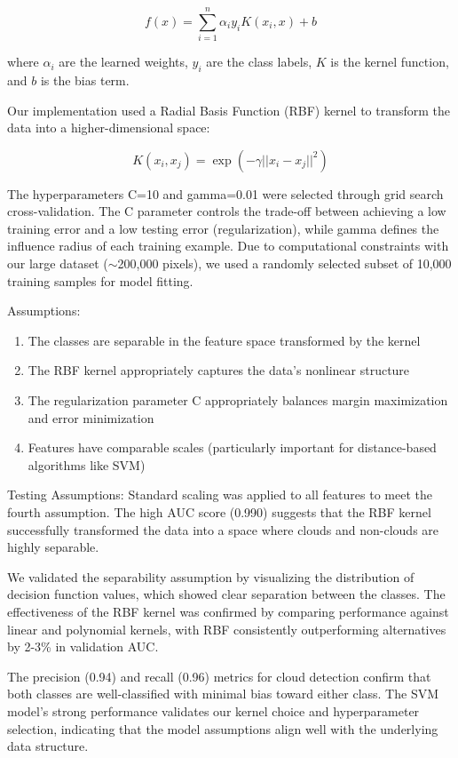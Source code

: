 \documentclass[10pt,letterpaper]{article}
\begin{document}
\begin{equation}
f(x) = \sum_{i=1}^{n} \alpha_i y_i K(x_i, x) + b
\end{equation}

where $\alpha_i$ are the learned weights, $y_i$ are the class labels, $K$ is the kernel function, and $b$ is the bias term. 

Our implementation used a Radial Basis Function (RBF) kernel to transform the data into a higher-dimensional space:

\begin{equation}
K(x_i, x_j) = \exp(-\gamma ||x_i - x_j||^2)
\end{equation}

The hyperparameters C=10 and gamma=0.01 were selected through grid search cross-validation. The C parameter controls the trade-off between achieving a low training error and a low testing error (regularization), while gamma defines the influence radius of each training example. Due to computational constraints with our large dataset ($\sim$200,000 pixels), we used a randomly selected subset of 10,000 training samples for model fitting.

Assumptions:
\begin{enumerate}
    \item The classes are separable in the feature space transformed by the kernel
    \item The RBF kernel appropriately captures the data's nonlinear structure
    \item The regularization parameter C appropriately balances margin maximization and error minimization
    \item Features have comparable scales (particularly important for distance-based algorithms like SVM)
\end{enumerate}

Testing Assumptions:
Standard scaling was applied to all features to meet the fourth assumption. The high AUC score (0.990) suggests that the RBF kernel successfully transformed the data into a space where clouds and non-clouds are highly separable. 

We validated the separability assumption by visualizing the distribution of decision function values, which showed clear separation between the classes. The effectiveness of the RBF kernel was confirmed by comparing performance against linear and polynomial kernels, with RBF consistently outperforming alternatives by 2-3\% in validation AUC.

The precision (0.94) and recall (0.96) metrics for cloud detection confirm that both classes are well-classified with minimal bias toward either class. The SVM model's strong performance validates our kernel choice and hyperparameter selection, indicating that the model assumptions align well with the underlying data structure.
\end{document}
